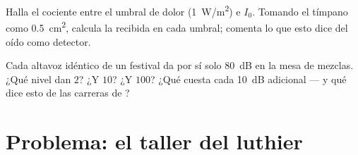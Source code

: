 \begin{exercise}[$\star\star\star$]\label{exo:g12:sound-acoustics:14}
Halla el cociente entre el umbral de dolor (\qty{1}{W/m^2}) e $I_0$.
Tomando el tímpano como \qty{0.5}{cm^2}, calcula la  recibida en
cada umbral; comenta lo que esto dice del oído como detector.
\end{exercise}

\begin{exercise}[$\star\star\star$]\label{exo:g12:sound-acoustics:15}
Cada altavoz idéntico de un festival da por sí solo \qty{80}{dB} en la
mesa de mezclas. ¿Qué nivel dan $2$? ¿Y $10$? ¿Y $100$? ¿Qué cuesta cada
\qty{+10}{dB} adicional --- y qué dice esto de las carreras de
?
\end{exercise}

\section{Problema: el taller del luthier}

